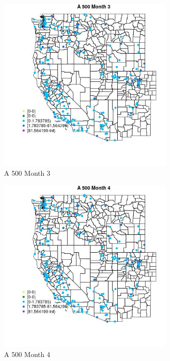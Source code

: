 \begin{figure} 
\centering  
\includegraphics[width=0.77\textwidth]{Code_Outputs/Report_ML_input_PM25_Step4_part_e_de_duplicated_aveswNAs_MapObsMo3A_500.jpg} 
\caption{\label{fig:Report_ML_input_PM25_Step4_part_e_de_duplicated_aveswNAsMapObsMo3A_500}A 500 Month 3} 
\end{figure} 
 

\begin{figure} 
\centering  
\includegraphics[width=0.77\textwidth]{Code_Outputs/Report_ML_input_PM25_Step4_part_e_de_duplicated_aveswNAs_MapObsMo4A_500.jpg} 
\caption{\label{fig:Report_ML_input_PM25_Step4_part_e_de_duplicated_aveswNAsMapObsMo4A_500}A 500 Month 4} 
\end{figure} 
 

